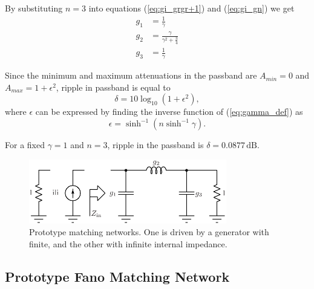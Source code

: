 \documentclass[lettersize,journal]{IEEEtran}
\begin{document}
By substituting $n = 3$ into equations (\ref{eq:gi_grgr+1}) and (\ref{eq:gi_gn}) we get
%
\begin{subequations} \label{eq:gi_all_val}
	\begin{align}
		g_1 &= \frac{1}{\gamma} \label{eq:g1_val} \\
		g_2 &= \frac{\gamma}{\gamma^2 + \frac{3}{4}} \label{eq:g2_val} \\
		g_3 &= \frac{1}{\gamma} \label{eq:g3_val} 
	\end{align}
\end{subequations}

Since the minimum and maximum attenuations in the passband are $A_{min} = 0$ and $A_{max} = 1 + \epsilon^2$, ripple in passband is equal to
%
\begin{equation}
	\label{eq:cheb_ripple}
	\delta = 10 \log_{10} \left( 1 + \epsilon^2 \right),
\end{equation}
%
where $\epsilon$ can be expressed by finding the inverse function of (\ref{eq:gamma_def}) as 
%
\begin{equation}
	\label{eq:epsilon}
	\epsilon = \sinh^{-1} \left( n \sinh^{-1} \gamma \right).
\end{equation}


For a fixed $\gamma = 1$ and $n = 3$, ripple in the passband is $\delta = 0.0877 \, \text{dB}$.

\begin{figure}[!t]
\centering
\includegraphics[width=3.4in]{./fig/prototype.pdf}
\caption{Prototype matching networks. One is driven by a generator with finite,
and the other with infinite internal impedance.}
\label{fig:prototype}
\end{figure}

\subsection{Prototype Fano Matching Network}
\end{document}
